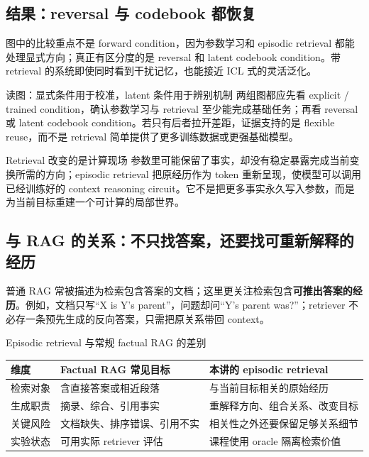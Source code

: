 \subsection{结果：reversal 与 codebook 都恢复}

图中的比较重点不是 forward condition，因为参数学习和 episodic retrieval 都能处理显式方向；真正有区分度的是 reversal 和 latent codebook condition。带 retrieval 的系统即使同时看到干扰记忆，也能接近 ICL 式的灵活泛化。


\begin{knowledgebox}{读图：显式条件用于校准，latent 条件用于辨别机制}
两组图都应先看 explicit / trained condition，确认参数学习与 retrieval 至少能完成基础任务；再看 reversal 或 latent codebook condition。若只有后者拉开差距，证据支持的是 flexible reuse，而不是 retrieval 简单提供了更多训练数据或更强基础模型。
\end{knowledgebox}


\begin{importantbox}{Retrieval 改变的是计算现场}
参数里可能保留了事实，却没有稳定暴露完成当前变换所需的方向；episodic retrieval 把原经历作为 token 重新呈现，使模型可以调用已经训练好的 context reasoning circuit。它不是把更多事实永久写入参数，而是为当前目标重建一个可计算的局部世界。
\end{importantbox}

\subsection{与 RAG 的关系：不只找答案，还要找可重新解释的经历}

普通 RAG 常被描述为检索包含答案的文档；这里更关注检索包含\textbf{可推出答案的经历}。例如，文档只写“X is Y's parent”，问题却问“Y's parent was?”；retriever 不必存一条预先生成的反向答案，只需把原关系带回 context。

\begin{knowledgebox}{Episodic retrieval 与常规 factual RAG 的差别}
\begin{tabularx}{\textwidth}{L{0.24\textwidth}X X}
\toprule
维度 & Factual RAG 常见目标 & 本讲的 episodic retrieval \\
\midrule
检索对象 & 含直接答案或相近段落 & 与当前目标相关的原始经历 \\
生成职责 & 摘录、综合、引用事实 & 重解释方向、组合关系、改变目标 \\
关键风险 & 文档缺失、排序错误、引用不实 & 相关性之外还要保留足够关系细节 \\
实验状态 & 可用实际 retriever 评估 & 课程使用 oracle 隔离检索价值 \\
\bottomrule
\end{tabularx}
\end{knowledgebox}


